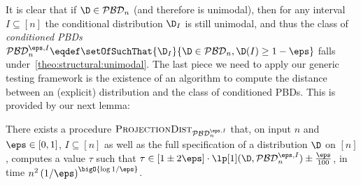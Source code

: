 It is clear that if $\D\in\classpbd_n$ (and therefore is unimodal), then for any interval $I\subseteq[n]$ the conditional distribution $\D_I$ is still unimodal, and thus the class of \emph{conditioned PBDs} $\classpbd_n^{\eps,I}\eqdef \setOfSuchThat{\D_I}{\D\in\classpbd_n, \D(I) \geq 1-\eps}$ falls under~\cref{theo:structural:unimodal}. The last piece we need to apply our generic testing framework is the existence of an algorithm to compute the distance between an (explicit) distribution and the class of conditioned PBDs. This is provided by our next lemma:
\begin{claim}\label{lemma:distance:pbd}
There exists a procedure $\estimdist[\classpbd_n^{\eps,I}]$ that, on input $n$ and $\eps \in [0,1]$, $I\subseteq[n]$ as well as the full specification of a distribution $\D$ on $[n]$, computes a value $\tau$ such that $\tau \in [1\pm 2\eps] \cdot \lp[1](\D,\classpbd_n^{\eps,I}) \pm \frac{\eps}{100}$, in time $n^2 \left( {1/\eps} \right)^{\bigO{\log{1/\eps}}}$.
\end{claim}
